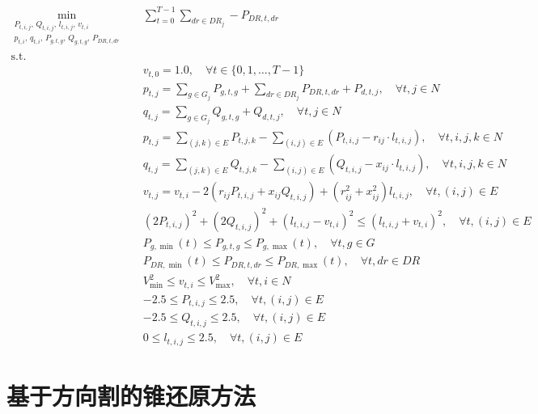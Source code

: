 \documentclass[12pt,a4paper]{article}
\begin{document}
\begin{align}
\min_{\substack{P_{t,i,j},\, Q_{t,i,j},\, l_{t,i,j},\, v_{t,i} \\ p_{t,i},\, q_{t,i},\, P_{g,t,g},\, Q_{g,t,g},\, P_{DR,t,dr}}} \quad & \sum_{t=0}^{T-1} \sum_{dr \in DR_j} -P_{DR,t,dr} \\
\text{s.t.} \quad \nonumber \\
& v_{t,0} = 1.0, \quad \forall t \in \{0,1,\ldots,T-1\} \tag{1} \\
& p_{t,j} = \sum_{g \in G_j} P_{g,t,g} + \sum_{dr \in DR_j} P_{DR,t,dr} + P_{d,t,j}, \quad \forall t,j \in N \tag{2a} \\
& q_{t,j} = \sum_{g \in G_j} Q_{g,t,g} + Q_{d,t,j}, \quad \forall t, j \in N \tag{2b} \\
& p_{t,j} = \sum_{(j,k) \in E} P_{t,j,k} - \sum_{(i,j) \in E} \left( P_{t,i,j} - r_{ij} \cdot l_{t,i,j} \right), \quad \forall t,i,j,k \in N \tag{3a} \\
& q_{t,j} = \sum_{(j,k) \in E} Q_{t,j,k} - \sum_{(i,j) \in E} \left( Q_{t,i,j} - x_{ij} \cdot l_{t,i,j} \right), \quad \forall t,i,j,k \in N \tag{3b} \\
& v_{t,j} = v_{t,i} - 2\left( r_{ij} P_{t,i,j} + x_{ij} Q_{t,i,j} \right) + \left( r_{ij}^2 + x_{ij}^2 \right) l_{t,i,j}, \quad \forall t, (i,j) \in E \tag{4} \\
& \left(2P_{t,i,j}\right)^2 + \left(2Q_{t,i,j}\right)^2 + \left(l_{t,i,j} - v_{t,i}\right)^2 \leq \left(l_{t,i,j} + v_{t,i}\right)^2, \quad \forall t, (i,j) \in E \tag{5} \\
& P_{g,\min}(t) \leq P_{g,t,g} \leq P_{g,\max}(t), \quad \forall t, g \in G \tag{6} \\
& P_{DR,\min}(t) \leq P_{DR,t,dr} \leq P_{DR,\max}(t), \quad \forall t, dr \in DR \tag{7} \\
& V_{\min}^2 \leq v_{t,i} \leq V_{\max}^2, \quad \forall t, i \in N \tag{8} \\
& -2.5 \leq P_{t,i,j} \leq 2.5, \quad \forall t, (i,j) \in E \tag{9a} \\
& -2.5 \leq Q_{t,i,j} \leq 2.5, \quad \forall t, (i,j) \in E \tag{9b} \\
& 0 \leq l_{t,i,j} \leq 2.5, \quad \forall t, (i,j) \in E \tag{9c}
\end{align}


\newpage
\section{基于方向割的锥还原方法}
\end{document}
